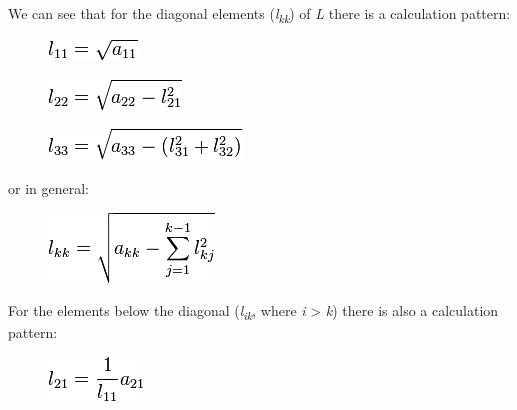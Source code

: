 We can see that for the diagonal elements
(\emph{l}\textsubscript{\emph{k}\emph{k}}) of \emph{L} there is a
calculation pattern:

\begin{figure}[H]
\centering
\includegraphics[scale=.6]{graphics/409b5a2625bed1a4a6c798323ae1db78.png}
\end{figure}

\begin{figure}[H]
\centering
\includegraphics[scale=.6]{graphics/2cf603737e11dad8ec4d00dc8298c639.png}
\end{figure}

\begin{figure}[H]
\centering
\includegraphics[scale=.6]{graphics/385714f276153424a4447fa0ede31bf4.png}
\end{figure}

or in general:

\begin{figure}[H]
\centering
\includegraphics[scale=.6]{graphics/af307c5e65e7403b785f8a2c6b9d051a.png}
\end{figure}

For the elements below the diagonal
(\emph{l}\textsubscript{\emph{i}\emph{k}}, where \emph{i} \textgreater{}
\emph{k}) there is also a calculation pattern:

\begin{figure}[H]
\centering
\includegraphics[scale=.6]{graphics/91035139969200d1af754ee0d07acd6a.png}
\end{figure}

